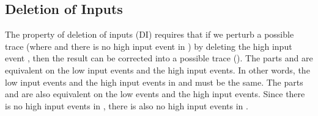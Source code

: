 \documentclass[10pt,a4paper,oneside]{article}
\begin{document}
\subsection{Deletion of Inputs} \label{sec:em:DI}
The property of deletion of inputs (DI) \cite{MANT-00-CSF} requires that if we perturb a possible trace  (where  and there is no high input event in ) by deleting the high input event , then the result can be corrected into a possible trace  (). The parts  and  are equivalent on the low input events and the high input events. In other words, the low input events and the high input events in  and  must be the same. The parts  and  are also equivalent on the low events and the high input events. Since there is no high input events in , there is also no high input events in .
\end{document}
